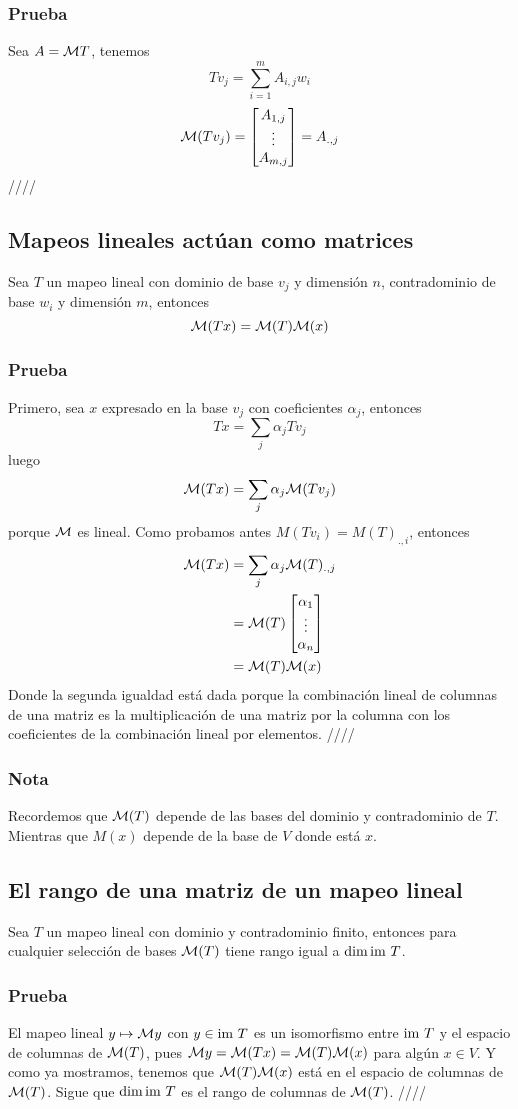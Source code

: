 \documentclass{article}
\begin{document}
\subsubsection*{Prueba}
Sea $A=\mathcal{M} T$, tenemos
$$Tv_j = \sum^m_{i=1}A_{i,j} w_i$$
$$\mathcal{M}(Tv_j) = \begin{bmatrix}
    A_{1,j}\\
    \vdots\\
    A_{m,j}
\end{bmatrix}
=
A_{.,j}$$
\hfill ////

\subsection{Mapeos lineales actúan como matrices}
Sea $T$ un mapeo lineal con dominio de base $v_j$ y dimensión $n$,
contradominio de base $w_i$ y dimensión $m$, entonces
$$\mathcal{M} (Tx) = \mathcal{M} (T)\mathcal{M} (x)$$
\subsubsection*{Prueba}
Primero, sea $x$ expresado en la base $v_j$ con coeficientes $\alpha_j$,
entonces $$Tx =\sum_j\alpha_j Tv_j$$
luego $$\mathcal{M}(Tx)=\sum_j\alpha_j\mathcal{M}(Tv_j)$$
porque $\mathcal{M}$ es lineal. Como probamos antes
$M(Tv_i) = M(T)_{.,i}$, entonces
\begin{align*}
    \mathcal{M}(Tx) &= \sum_j\alpha_j\mathcal{M}(T)_{.,j}\\
    &= \mathcal{M}(T) \begin{bmatrix}
        \alpha_1 \\
        \vdots \\
        \alpha_n
    \end{bmatrix}\\
    &= \mathcal{M}(T)\mathcal{M}(x)
\end{align*}
Donde la segunda igualdad está dada porque la combinación
lineal de columnas de una matriz es la multiplicación de una matriz
por la columna con los coeficientes de la combinación lineal por 
elementos. \hfill ////

\subsubsection{Nota}
Recordemos que $\mathcal{M}(T)$ depende de las bases del dominio y 
contradominio de $T$. Mientras que $M(x)$ depende de la base
de $V$ donde está $x$.

\subsection{El rango de una matriz de un mapeo lineal}
Sea $T$ un mapeo lineal con dominio y contradominio finito,
entonces para cualquier selección de bases $\mathcal{M}(T)$ tiene rango
igual a $\dim\text{im } T$.
\subsubsection*{Prueba}
El mapeo lineal $y \mapsto \mathcal{M} y$ con $y\in\text{im } T$ es un isomorfismo
entre $\text{im } T$ y el espacio de columnas de $\mathcal{M}(T)$, pues
$\mathcal{M} y=\mathcal{M}(Tx) = \mathcal{M}(T)\mathcal{M}(x)$ para algún $x\in V$. Y como ya mostramos,
tenemos que $\mathcal{M}(T)\mathcal{M}(x)$ está en el espacio de columnas de $\mathcal{M}(T)$.
Sigue que $\dim\text{im } T$ es el rango de columnas de $\mathcal{M}(T)$.
\hfill ////
\end{document}
